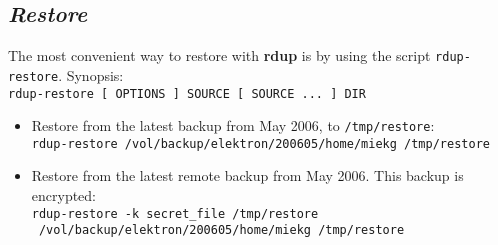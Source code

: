 \documentclass[a4paper, openany]{blocksbook}
\newcommand{\rdup}{\textbf{rdup}}
\newcommand{\cmd}[1]{\texttt{#1}}
\newcommand{\path}[1]{\texttt{#1}}
\begin{document}
\subsection*{\textit{Restore}}
The most convenient way to restore with \rdup{} is by using
the script \cmd{rdup-restore}. Synopsis:\\
\cmd{rdup-restore [ OPTIONS ] SOURCE [ SOURCE ... ] DIR}
\begin{itemize}
\item
Restore from the latest backup from May 2006, to \path{/tmp/restore}:\\
\cmd{rdup-restore /vol/backup/elektron/200605/home/miekg /tmp/restore}
\item
Restore from the latest remote backup from May 2006. This backup
is encrypted:\\
\cmd{rdup-restore -k secret\_file /tmp/restore \\\
/vol/backup/elektron/200605/home/miekg /tmp/restore}
\end{itemize}
\end{document}
